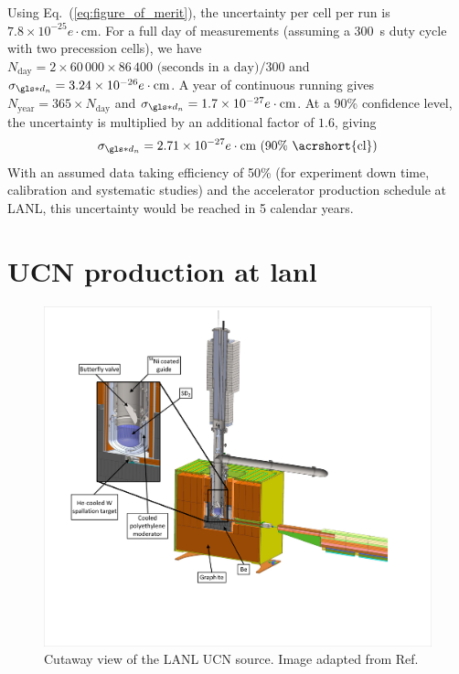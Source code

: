 Using Eq.~(\ref{eq:figure_of_merit}), the uncertainty per cell per run is $7.8 \times 10^{-25}e\cdot\text{cm}$. For a full day of measurements (assuming a \qty{300}{\s} duty cycle with two precession cells), we have $N_\text{day}=2\times60\,000\times86\,400\text{ (seconds in a day)}/300$ and $\sigma_{\gls*{d_n}}=3.24\times10^{-26}e\cdot\text{cm}$. A year of continuous running gives $N_\text{year}=365\times N_\text{day}$ and $\sigma_{\gls*{d_n}}=1.7\times10^{-27}e\cdot\text{cm}$. At a 90\% confidence level, the uncertainty is multiplied by an additional factor of $1.6$, giving
%
\begin{gather}
    \sigma_{\gls*{d_n}}=2.71\times10^{-27}e\cdot\text{cm (90\% \acrshort{cl})}
\end{gather}
%
With an assumed data taking efficiency of 50\% (for experiment down time, calibration and systematic studies) and the accelerator production schedule at LANL, this uncertainty would be reached in 5 calendar years.


\section
{
    \texorpdfstring{UCN production at \acrshort{lanl}}
                   {UCN production at LANL}
}\label{sec:lanl_ucn_source}


\begin{figure}
    \centering
    \includegraphics[width=0.6 \textwidth]{figures/lanl_ucn_source.pdf}
    \caption[Cutaway view of the LANL UCN source]
    {Cutaway view of the LANL UCN source. Image adapted from Ref.~\cite{ito_performance_2018}}
    \label{fig:lanl_ucn_source}
\end{figure}

